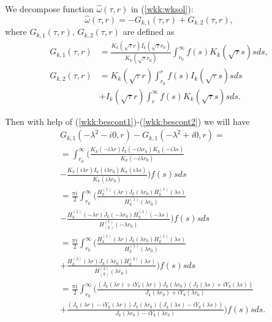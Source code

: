 \documentclass[manuscript, printscheme]{paper}
\begin{document}
We decompose function $\hat \omega(\tau,r)$ in (\ref{wkk:wksol}):
$$
 \hat \omega(\tau,r) = -G_{k,1}(\tau,r)+ G_{k,2}(\tau,r), 
$$ 
where $G_{k,1}(\tau,r)$, $G_{k,2}(\tau,r)$ are defined as 
\begin{align*}
G_{k,1}(\tau,r) &=  \frac{K_k(\sqrt{\tau}r)I_k(\sqrt{\tau}r_0)}{K_k(\sqrt{\tau}r_0)} \int_{r_0}^{\infty} f(s) K_k(\sqrt{\tau}s) s ds, \nonumber \\
G_{k,2}(\tau,r) &= K_k(\sqrt{\tau}r)\int_{r_0}^r f(s) I_k(\sqrt{\tau}s) s ds \nonumber \\ 
&+ I_k(\sqrt{\tau}r)\int_r^{\infty} f(s) K_k(\sqrt{\tau}s) sds. \nonumber
\end{align*}

Then with help of (\ref{wkk:bescont1})-(\ref{wkk:bescont2}) we will have
\begin{align*}
&G_{k,1}(-\lambda^2-i0,r)  - G_{k,1}(-\lambda^2+i0,r) = \\
&=\int_{r_0}^\infty \Big ( \frac{K_k(-i\lambda r) I_{k}(-i\lambda r_0)K_k(-i\lambda s)}{K_{k}(-i\lambda r_0)} \\
&- \frac{K_k(i\lambda r) I_{k}(i\lambda r_0)K_k(i\lambda s)}{K_{k}(i\lambda r_0)} \Big ) f(s)  s ds \nonumber \\
&=\frac{\pi i}2 \int_{r_0}^\infty \Big ( \frac{H_k^{(1)}(\lambda r) J_{k}(\lambda r_0)H_k^{(1)}(\lambda s)}{H_{k}^{(1)}(\lambda r_0)} \\
&- \frac{H_{k}^{(1)}(-\lambda r) J_{k}(-\lambda r_0)H_{k}^{(1)}(-\lambda s)}{H_{(k)}^{(1)}(-\lambda r_0)} \Big ) f(s)  s ds \nonumber \\
&=\frac{\pi i}2 \int_{r_0}^\infty \Big ( \frac{H_k^{(1)}(\lambda r) J_{k}(\lambda r_0)H_k^{(1)}(\lambda s)}{H_{k}^{(1)}(\lambda r_0)} \\
&+ \frac{H_{k}^{(2)}(\lambda r) J_{k}(\lambda r_0)H_{k}^{(2)}(\lambda s)}{H_{(k)}^{(2)}(\lambda r_0)} \Big ) f(s)  s ds \nonumber \\
&=\frac{\pi i}2 \int_{r_0}^\infty  \Big ( \frac{(J_k(\lambda r)+iY_k(\lambda r)) J_{k}(\lambda r_0)(J_k(\lambda s)+iY_k(\lambda s))}{J_{k}(\lambda r_0)+iY_{k}(\lambda r_0)} \\ 
& + \frac{(J_k(\lambda r)-iY_k(\lambda r)) J_{k}(\lambda r_0)(J_k(\lambda s)-iY_k(\lambda s))}{J_{k}(\lambda r_0)-iY_{k}(\lambda r_0)}  \Big ) f(s)  s ds.
\nonumber
\end{align*}
\end{document}
